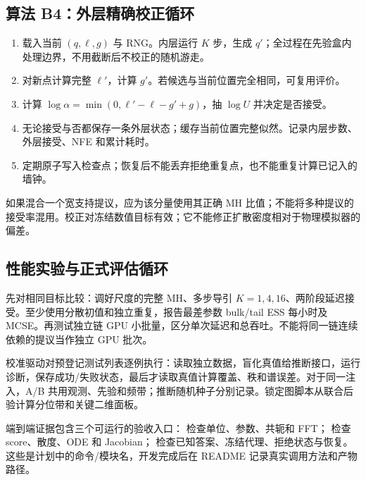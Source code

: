 \documentclass[UTF8,fontset=none,a4paper,11pt]{ctexart}
\begin{document}
\subsection{算法 B4：外层精确校正循环}
\begin{enumerate}
\item 载入当前 $(q,\ell,g)$ 与 RNG。内层运行 $K$ 步，生成 $q'$；全过程在先验盒内处理边界，不用截断后不校正的随机游走。
\item 对新点计算完整 $\ell'$，计算 $g'$。若候选与当前位置完全相同，可复用评价。
\item 计算 $\log\alpha=\min(0,\ell'-\ell-g'+g)$，抽 $\log U$ 并决定是否接受。
\item 无论接受与否都保存一条外层状态；缓存当前位置完整似然。记录内层步数、外层接受、NFE 和累计耗时。
\item 定期原子写入检查点；恢复后不能丢弃拒绝重复点，也不能重复计算已记入的墙钟。
\end{enumerate}
如果混合一个宽支持提议，应为该分量使用其正确 MH 比值；不能将多种提议的接受率混用。校正对冻结数值目标有效；它不能修正扩散密度相对于物理模拟器的偏差。
\subsection{性能实验与正式评估循环}
先对相同目标比较：调好尺度的完整 MH、多步导引 $K=1,4,16$、两阶段延迟接受。至少使用分散初值和独立重复，报告最差参数 bulk/tail ESS 每小时及 MCSE。再测试独立链 GPU 小批量，区分单次延迟和总吞吐。不能将同一链连续依赖的提议当作独立 GPU 批次。
\par 校准驱动对预登记测试列表逐例执行：读取独立数据，盲化真值给推断接口，运行诊断，保存成功/失败状态，最后才读取真值计算覆盖、秩和谱误差。对于同一注入，A/B 共用观测、先验和频带；推断随机种子分别记录。锁定图脚本从联合后验计算分位带和关键二维面板。
\par 端到端证据包含三个可运行的验收入口： 检查单位、参数、共轭和 FFT； 检查 score、散度、ODE 和 Jacobian； 检查已知答案、冻结代理、拒绝状态与恢复。这些是计划中的命令/模块名，开发完成后在 README 记录真实调用方法和产物路径。
\end{document}
